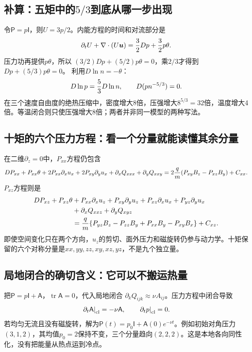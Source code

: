 \subsection{补算：五矩中的$5/3$到底从哪一步出现}
令$\mathsf P=p\mathsf I$，则$U=3p/2$。内能方程的时间和对流部分是
\begin{equation}
 \partial_tU+\nabla\cdot(U\bm{u})
 ={3\over2}Dp+{3\over2}p\theta.
\end{equation}
压力功再提供$p\theta$，所以
$(3/2)Dp+(5/2)p\theta=0$，乘$2/3$才得到
$Dp+(5/3)p\theta=0$。
利用$D\ln n=-\theta$：
\begin{equation}
 D\ln p={5\over3}D\ln n,\qquad D(pn^{-5/3})=0.
\end{equation}
在三个速度自由度的绝热压缩中，密度增大8倍，压强增大$8^{5/3}=32$倍，温度增大4倍。等温闭合则只使压强增大8倍；两者并非同一模型的两种写法。

\subsection{十矩的六个压力方程：看一个分量就能读懂其余分量}
在二维$\partial_z=0$中，$P_{xx}$方程仍包含
\begin{align}
 DP_{xx}+P_{xx}\theta
 +2P_{xx}\partial_xu_x+2P_{xy}\partial_yu_x
 +\partial_xQ_{xxx}+\partial_yQ_{xxy}
 =2{q\over m}(P_{xy}B_z-P_{xz}B_y)+C_{xx}.
\end{align}
$P_{xz}$方程则是
\begin{align}
 DP_{xz}+P_{xz}\theta
 &+P_{xx}\partial_xu_z+P_{xy}\partial_yu_z
 +P_{xz}\partial_xu_x+P_{yz}\partial_yu_x\\
 &+\partial_xQ_{xxz}+\partial_yQ_{xyz}\nonumber\\
 &={q\over m}\{P_{yz}B_z-P_{zz}B_y
                  +P_{xx}B_y-P_{xy}B_x\}+C_{xz}.\nonumber
\end{align}
即使空间变化只在两个方向，$u_z$的剪切、面外压力和磁旋转仍参与动力学。十矩保留的六个对称分量是$xx,yy,zz,xy,xz,yz$，不是九个独立量。

\subsection{局地闭合的确切含义：它可以不搬运热量}
把$\mathsf P=p\mathsf I+\mathsf A$，$\operatorname{tr}\mathsf A=0$，代入局地闭合
$\partial_kQ_{ijk}\approx\nu A_{ij}$。压力方程中闭合导致
\begin{equation}
 \left.\partial_t\mathsf A\right|_{\rm cl}=-\nu\mathsf A,\qquad
 \left.\partial_tp\right|_{\rm cl}=0.
\end{equation}
若均匀无流且没有磁旋转，解为$\mathsf P(t)=p_0\mathsf I+\mathsf A(0)e^{-\nu t}$。例如初始对角压力$(3,1,2)$，其均值$p_0=2$保持不变，三个分量趋向$(2,2,2)$。这是本地各向同性化，没有把能量从热点运到冷点。

